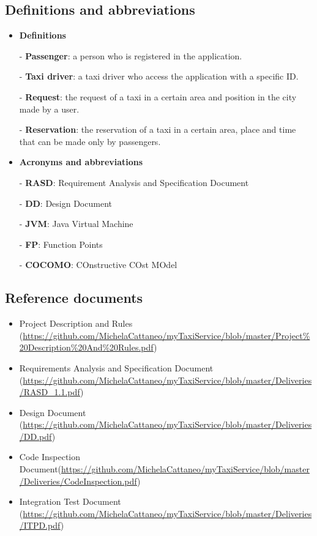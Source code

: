 \documentclass[18pt,oneside,a4paper, titlepage]{article}
\begin{document}
	\subsection{Definitions and abbreviations}
		\begin{itemize}
			\item \textbf{Definitions}
			\item[-] \textbf{Passenger}: a person who is registered in the application.
			\item[-] \textbf{Taxi driver}: a taxi driver who access the application with a specific ID.
			\item[-] \textbf{Request}: the request of a taxi in a certain area and position in the city made by a user.
			\item[-] \textbf{Reservation}: the reservation of a taxi in a certain area, place and time that can be made only by passengers.
	
			\item \textbf{Acronyms and abbreviations}
			\item[-] \textbf{RASD}: Requirement Analysis and Specification Document
			\item[-] \textbf{DD}: Design Document
			\item[-] \textbf{JVM}: Java Virtual Machine
			\item[-] \textbf{FP}: Function Points
			\item[-] \textbf{COCOMO}: COnstructive COst MOdel
			
		\end{itemize}
	\subsection{Reference documents}
		\begin{itemize}
			\item Project Description and Rules (\url{https://github.com/MichelaCattaneo/myTaxiService/blob/master/Project\%20Description\%20And\%20Rules.pdf})
			\item Requirements Analysis and Specification Document (\url{https://github.com/MichelaCattaneo/myTaxiService/blob/master/Deliveries/RASD_1.1.pdf})
			\item Design Document (\url{https://github.com/MichelaCattaneo/myTaxiService/blob/master/Deliveries/DD.pdf})
			\item Code Inspection Document(\url{https://github.com/MichelaCattaneo/myTaxiService/blob/master/Deliveries/CodeInspection.pdf})
			\item Integration Test Document (\url{https://github.com/MichelaCattaneo/myTaxiService/blob/master/Deliveries/ITPD.pdf})
		\end{itemize}
\end{document}
